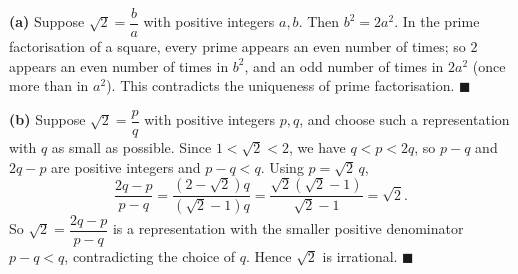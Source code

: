 \textbf{(a)} Suppose $\sqrt2=\dfrac {b}{a}$ with positive integers $a,b$. Then $b^2=2a^2$. In the prime factorisation of a square, every prime appears an even number of times; so $2$ appears an even number of times in $b^2$, and an odd number of times in $2a^2$ (once more than in $a^2$). This contradicts the uniqueness of prime factorisation. $\blacksquare$

\textbf{(b)} Suppose $\sqrt2=\dfrac {p}{q}$ with positive integers $p,q$, and choose such a representation with $q$ as small as possible. Since $1<\sqrt2<2$, we have $q<p<2q$, so $p-q$ and $2q-p$ are positive integers and $p-q<q$. Using $p=\sqrt2\,q$,
\[
\dfrac{2q-p}{p-q}=\dfrac{\left(2-\sqrt2\right)q}{\left(\sqrt2-1\right)q}=\dfrac{\sqrt2\left(\sqrt2-1\right)}{\sqrt2-1}=\sqrt2 .
\]
So $\sqrt2=\dfrac{2q-p}{p-q}$ is a representation with the smaller positive denominator $p-q<q$, contradicting the choice of $q$. Hence $\sqrt2$ is irrational. $\blacksquare$
